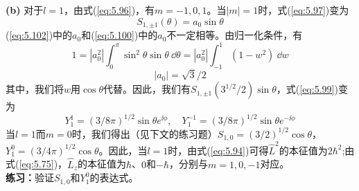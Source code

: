 \begin{examplebox}
        \textbf{(b)} 对于$l=1$，由式(\ref{eq:5.96})，有$m=-1, 0, 1$。当$\left|m\right| = 1$时，式(\ref{eq:5.97})变为
        \begin{equation}
            S_{1,\pm 1}\left(\theta\right) = a_0\sin\theta
            \label{eq:5.102}
        \end{equation}
        (\ref{eq:5.102})中的$a_0$和(\ref{eq:5.100})中的$a_0$不一定相等。由归一化条件，有
        \begin{equation*}
            1 = \left|a_0^2\right|\int_{0}^{\pi}\sin^2\theta\sin\theta \: \dd \theta = \left|a_0^2\right|\int_{-1}^{1}\left(1-w^2\right) \: \dd w
        \end{equation*}
        \begin{equation*}
            \left|a_0\right| = \sqrt{3}/2
        \end{equation*}
        其中，我们将$w$用$\cos\theta$代替。因此，我们有$S_{1,\pm 1}\left(3^{1/2}/2\right)\sin\theta$，式(\ref{eq:5.99})变为
        \begin{equation}
            Y_1^1 = \left(3/8\pi\right)^{1/2}\sin\theta e^{\ii \phi}, \quad Y_1^{-1} = \left(3/8\pi\right)^{1/2}\sin\theta e^{-\ii \phi}
            \label{eq:5.103}
        \end{equation}
        当$l=1$而$m=0$时，我们得出（见下文的练习题）$S_{1,0} = \left(3/2\right)^{1/2}\cos\theta$，$Y_1^0 = \left(3/4\pi\right)^{1/2}\cos\theta$。因此，当$l=1$时，由式(\ref{eq:5.94})可得$\hat{L}^2$的本征值为$2\hbar^2$;由式(\ref{eq:5.75})，$\hat{L}_z$的本征值为$\hbar$、$0$和$-\hbar$，分别与$m=1, 0, -1$对应。
        \\

        \textbf{练习：}验证$S_{1,0}$和$Y_1^0$的表达式。
    \end{examplebox}

